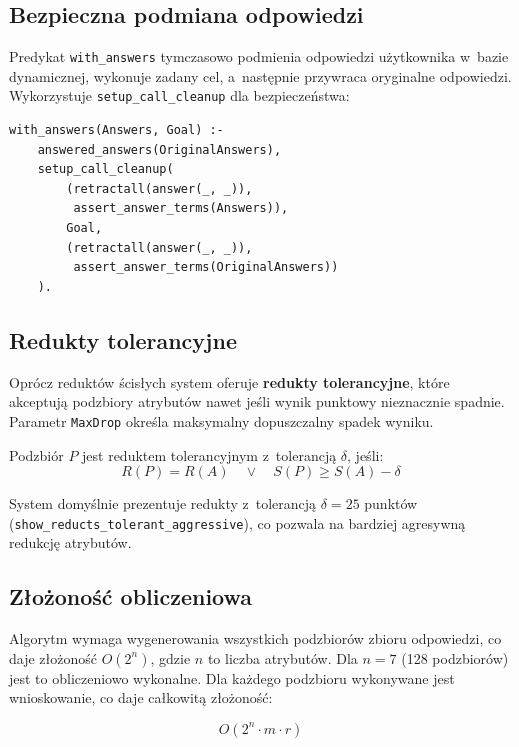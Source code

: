 \documentclass[12pt,a4paper]{article}
\begin{document}
\subsection{Bezpieczna podmiana odpowiedzi}

Predykat \texttt{with\_answers} tymczasowo podmienia odpowiedzi użytkownika w~bazie dynamicznej, wykonuje zadany cel, a~następnie przywraca oryginalne odpowiedzi. Wykorzystuje \texttt{setup\_call\_cleanup} dla bezpieczeństwa:

\begin{lstlisting}[style=prolog, caption={Bezpieczna podmiana kontekstu odpowiedzi}]
with_answers(Answers, Goal) :-
    answered_answers(OriginalAnswers),
    setup_call_cleanup(
        (retractall(answer(_, _)),
         assert_answer_terms(Answers)),
        Goal,
        (retractall(answer(_, _)),
         assert_answer_terms(OriginalAnswers))
    ).
\end{lstlisting}

\subsection{Redukty tolerancyjne}

Oprócz reduktów ścisłych system oferuje \textbf{redukty tolerancyjne}, które akceptują podzbiory atrybutów nawet jeśli wynik punktowy nieznacznie spadnie. Parametr \texttt{MaxDrop} określa maksymalny dopuszczalny spadek wyniku.

Podzbiór $P$ jest reduktem tolerancyjnym z~tolerancją $\delta$, jeśli:
\begin{equation}
R(P) = R(A) \quad \lor \quad S(P) \geq S(A) - \delta
\end{equation}

System domyślnie prezentuje redukty z~tolerancją $\delta = 25$ punktów (\texttt{show\_reducts\_tolerant\_aggressive}), co pozwala na bardziej agresywną redukcję atrybutów.

\subsection{Złożoność obliczeniowa}

Algorytm wymaga wygenerowania wszystkich podzbiorów zbioru odpowiedzi, co daje złożoność $O(2^n)$, gdzie $n$ to liczba atrybutów. Dla $n = 7$ (128 podzbiorów) jest to obliczeniowo wykonalne. Dla każdego podzbioru wykonywane jest wnioskowanie, co daje całkowitą złożoność:

\begin{equation}
O(2^n \cdot m \cdot r)
\end{equation}
\end{document}

